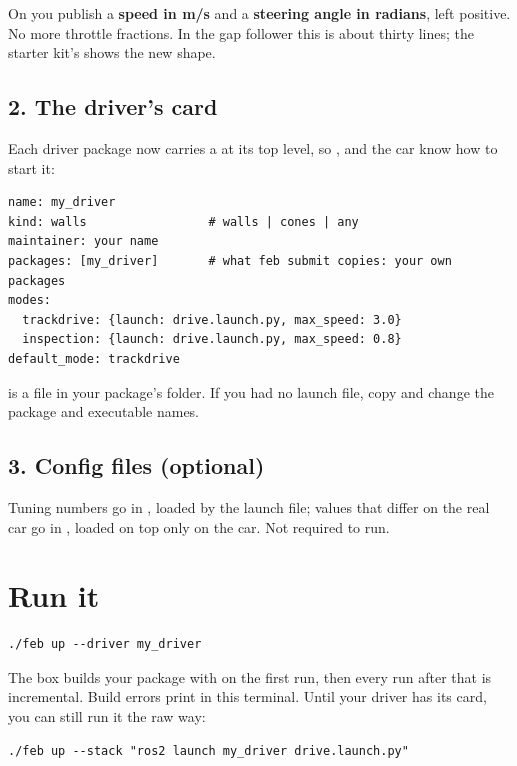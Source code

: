 \documentclass[11pt,a4paper]{article}
\begin{document}
\medskip
On  you publish a \textbf{speed in m/s} and a \textbf{steering angle in radians}, left
positive. No more throttle fractions. In the gap follower this is about thirty lines; the starter
kit's  shows the new shape.

\subsection*{2. The driver's card}

Each driver package now carries a  at its top level, so ,  and the car know how to start it:

\begin{lstlisting}
name: my_driver
kind: walls                 # walls | cones | any
maintainer: your name
packages: [my_driver]       # what feb submit copies: your own packages
modes:
  trackdrive: {launch: drive.launch.py, max_speed: 3.0}
  inspection: {launch: drive.launch.py, max_speed: 0.8}
default_mode: trackdrive
\end{lstlisting}

 is a file in your package's  folder. If you had no launch file, copy
 and change the package and executable names.

\subsection*{3. Config files (optional)}

Tuning numbers go in , loaded by the launch file; values that differ on
the real car go in , loaded on top only on the car. Not required to run.

\section{Run it}

\begin{lstlisting}
./feb up --driver my_driver
\end{lstlisting}

The box builds your package with  on the first run, then every run after that is
incremental. Build errors print in this terminal. Until your driver has its card, you can still run
it the raw way:

\begin{lstlisting}
./feb up --stack "ros2 launch my_driver drive.launch.py"
\end{lstlisting}
\end{document}
